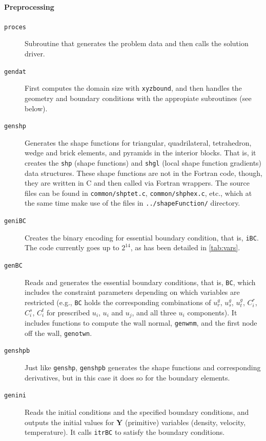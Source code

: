 \documentclass{ucb}
\begin{document}
\paragraph{Preprocessing}

\begin{description}

    \item[\texttt{proces}] Subroutine that generates the problem data and then calls the solution driver.
    
    \item[\texttt{gendat}] First computes the domain size with \texttt{xyzbound}, and then handles the geometry and boundary conditions with the appropiate subroutines (see below).
    
    \item[\texttt{genshp}] Generates the shape functions for triangular, quadrilateral, tetrahedron, wedge and brick elements, and pyramids in the interior blocks. That is, it creates the \texttt{shp} (shape functions) and \texttt{shgl} (local shape function gradients) data structures. These shape functions are not in the Fortran code, though, they are written in C and then called via Fortran wrappers. The source files can be found in \texttt{common/shptet.c}, \texttt{common/shphex.c}, etc., which at the same time make use of the files in \texttt{../shapeFunction/} directory.
    
    \item[\texttt{geniBC}] Creates the binary encoding for essential boundary condition, that is, \texttt{iBC}. The code currently goes up to $2^{14}$, as has been detailed in \autoref{tab:vars}.
    
    \item[\texttt{genBC}] Reads and generates the essential boundary conditions, that is, \texttt{BC}, which includes the constraint parameters depending on which variables are restricted (e.g., \texttt{BC} holds the corresponding combinations of $u_r^g$, $u_s^g$, $u_t^g$, $C_i^r$, $C_i^s$, $C_i^t$ for prescribed $u_i$, $u_i$ and $u_j$, and all three $u_i$ components). It includes functions to compute the wall normal, \texttt{genwnm}, and the first node off the wall, \texttt{genotwn}. 
    
    
    \item[\texttt{genshpb}] Just like \texttt{genshp}, \texttt{genshpb} generates the shape functions and corresponding derivatives, but in this case it does so for the boundary elements.
    
    \pagebreak
    
    \item[\texttt{genini}] Reads the initial conditions and the specified boundary conditions, and outputs the initial values for $\bm{Y}$ (primitive) variables (density, velocity, temperature). It calls \texttt{itrBC} to satisfy the boundary conditions.

\end{description}
\end{document}
